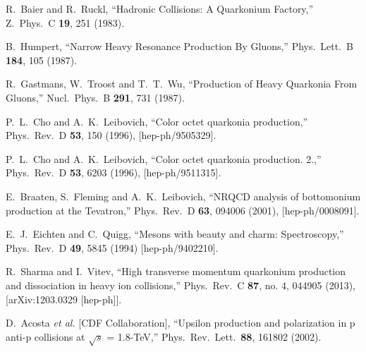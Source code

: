 \documentclass[aps,prc,preprint,superscriptaddress,showpacs,showkeys,amsmath]{revtex4-1}
\begin{document}
\begin{thebibliography}{100}
%
  R.~Baier and R.~Ruckl,
  ``Hadronic Collisions: A Quarkonium Factory,''
  Z.\ Phys.\ C {\bf 19}, 251 (1983).


  B.~Humpert,
  ``Narrow Heavy Resonance Production By Gluons,''
  Phys.\ Lett.\ B {\bf 184}, 105 (1987).



  R.~Gastmans, W.~Troost and T.~T.~Wu,
  ``Production of Heavy Quarkonia From Gluons,''
  Nucl.\ Phys.\ B {\bf 291}, 731 (1987).



  P.~L.~Cho and A.~K.~Leibovich,
  ``Color octet quarkonia production,''
  Phys.\ Rev.\ D {\bf 53}, 150 (1996),
  [hep-ph/9505329].

  P.~L.~Cho and A.~K.~Leibovich,
  ``Color octet quarkonia production. 2.,''
  Phys.\ Rev.\ D {\bf 53}, 6203 (1996),
  [hep-ph/9511315].

  E.~Braaten, S.~Fleming and A.~K.~Leibovich,
  ``NRQCD analysis of bottomonium production at the Tevatron,''
  Phys.\ Rev.\ D {\bf 63}, 094006 (2001),
  [hep-ph/0008091].

  E.~J.~Eichten and C.~Quigg,
  ``Mesons with beauty and charm: Spectroscopy,''
  Phys.\ Rev.\ D {\bf 49}, 5845 (1994)
  [hep-ph/9402210].

  R.~Sharma and I.~Vitev,
  ``High transverse momentum quarkonium production and dissociation in heavy ion collisions,''
  Phys.\ Rev.\ C {\bf 87}, no. 4, 044905 (2013),
  [arXiv:1203.0329 [hep-ph]].

  D.~Acosta {\it et al.}  [CDF Collaboration],
  ``Upsilon production and polarization in p anti-p collisions at $\sqrt{s}$ = 1.8-TeV,''
  Phys.\ Rev.\ Lett.\  {\bf 88}, 161802 (2002).


\end{thebibliography}
\end{document}
